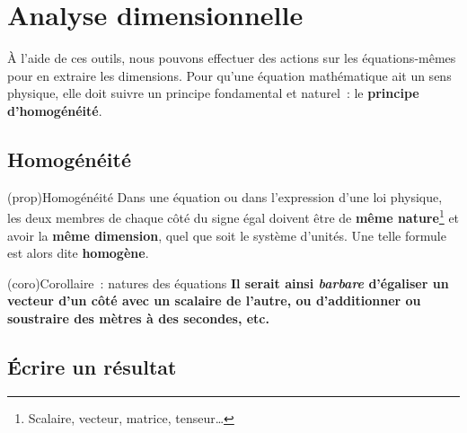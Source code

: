 \documentclass[../main/main.tex]{subfiles}
\begin{document}
\section{Analyse dimensionnelle}

À l'aide de ces outils, nous pouvons effectuer des actions sur les
équations-mêmes pour en extraire les dimensions. Pour qu'une équation
mathématique ait un sens physique, elle doit suivre un principe fondamental et
naturel~: le \textbf{principe d'homogénéité}.

\subsection{Homogénéité}

\begin{tcb}(prop){Homogénéité}
	Dans une équation ou dans l'expression d'une loi physique, les deux
	membres de chaque côté du signe égal doivent être de \textbf{même
		nature}\footnote{Scalaire, vecteur, matrice, tenseur…} et avoir la
	\textbf{même dimension}, quel que soit le système d'unités. Une telle
	formule est alors dite \textbf{homogène}.
\end{tcb}
\begin{tcb}[cnt](coro){Corollaire~: natures des équations}
	\bfseries Il serait ainsi \textit{barbare} d'égaliser un vecteur d'un côté
	avec un scalaire de l'autre, ou d'additionner ou soustraire
	des mètres à des secondes, etc.
\end{tcb}

\subsection{Écrire un résultat}
\end{document}
